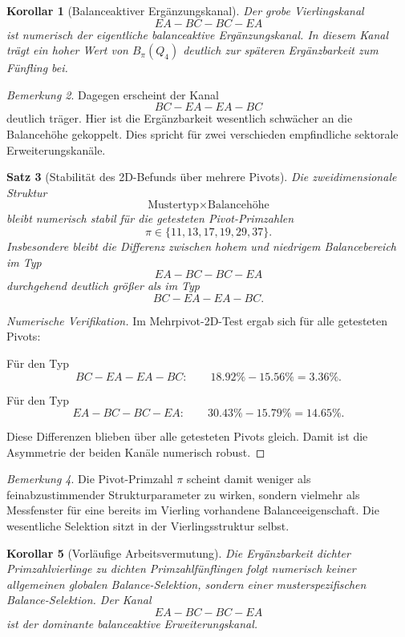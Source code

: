 \documentclass[11pt,a4paper]{article}
\newtheorem{satz}{Satz}
\newtheorem{korollar}[satz]{Korollar}
\theoremstyle{definition}
\theoremstyle{remark}
\newtheorem{bemerkung}[satz]{Bemerkung}
\begin{document}
	\begin{korollar}[Balanceaktiver Ergänzungskanal]
		\label{kor:balanceaktiver_kanal}
		Der grobe Vierlingskanal
		\[
		EA-BC-BC-EA
		\]
		ist numerisch der eigentliche balanceaktive Ergänzungskanal. In diesem Kanal trägt ein
		hoher Wert von \(B_\pi(Q_4)\) deutlich zur späteren Ergänzbarkeit zum Fünfling bei.
	\end{korollar}
	
	\begin{bemerkung}
		Dagegen erscheint der Kanal
		\[
		BC-EA-EA-BC
		\]
		deutlich träger. Hier ist die Ergänzbarkeit wesentlich schwächer an die Balancehöhe
		gekoppelt. Dies spricht für zwei verschieden empfindliche sektorale Erweiterungskanäle.
	\end{bemerkung}
	
	\begin{satz}[Stabilität des 2D-Befunds über mehrere Pivots]
		\label{satz:2d_befund_mehrere_pivots}
		Die zweidimensionale Struktur
		\[
		\text{Mustertyp} \times \text{Balancehöhe}
		\]
		bleibt numerisch stabil für die getesteten Pivot-Primzahlen
		\[
		\pi\in\{11,13,17,19,29,37\}.
		\]
		Insbesondere bleibt die Differenz zwischen hohem und niedrigem Balancebereich im Typ
		\[
		EA-BC-BC-EA
		\]
		durchgehend deutlich größer als im Typ
		\[
		BC-EA-EA-BC.
		\]
	\end{satz}
	
	\begin{proof}[Numerische Verifikation]
		Im Mehrpivot-2D-Test ergab sich für alle getesteten Pivots:
		
		Für den Typ
		\[
		BC-EA-EA-BC:
		\qquad
		18.92\%-15.56\%=3.36\%.
		\]
		
		Für den Typ
		\[
		EA-BC-BC-EA:
		\qquad
		30.43\%-15.79\%=14.65\%.
		\]
		
		Diese Differenzen blieben über alle getesteten Pivots gleich. Damit ist die Asymmetrie der
		beiden Kanäle numerisch robust.
	\end{proof}
	
	\begin{bemerkung}
		Die Pivot-Primzahl \(\pi\) scheint damit weniger als feinabzustimmender Strukturparameter zu
		wirken, sondern vielmehr als Messfenster für eine bereits im Vierling vorhandene
		Balanceeigenschaft. Die wesentliche Selektion sitzt in der Vierlingsstruktur selbst.
	\end{bemerkung}
	
	\begin{korollar}[Vorläufige Arbeitsvermutung]
		\label{kor:arbeitsvermutung_balance_kanal}
		Die Ergänzbarkeit dichter Primzahlvierlinge zu dichten Primzahlfünflingen folgt
		numerisch keiner allgemeinen globalen Balance-Selektion, sondern einer
		\emph{musterspezifischen Balance-Selektion}. Der Kanal
		\[
		EA-BC-BC-EA
		\]
		ist der dominante balanceaktive Erweiterungskanal.
	\end{korollar}
	
\end{document}
